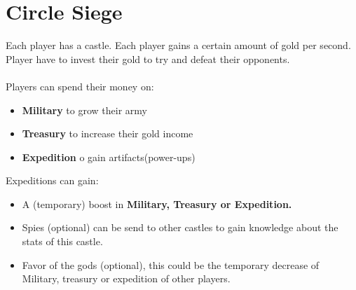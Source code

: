 \documentclass{article}
\begin{document}
\section{Circle Siege}
Each player has a castle. Each player gains a certain amount of gold per second. Player have to invest their gold to try and defeat their opponents. \\\\
Players can spend their money on:
 \begin{itemize}
 	\item \textbf{Military} to grow their army
 	\item \textbf{Treasury} to increase their gold income
 	\item \textbf{Expedition} o gain artifacts(power-ups)
 \end{itemize}
Expeditions can gain:
\begin{itemize}
	\item A (temporary) boost in \textbf{Military, Treasury or Expedition.}
	\item Spies (optional) can be send to other castles to gain knowledge about the stats of this castle.
	\item Favor of the gods (optional), this could be the temporary decrease of Military, treasury or expedition of other players.
\end{itemize}
\end{document}

